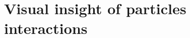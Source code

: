 \documentclass{sintefbeamer}
\newcommand{\pnavg}[1]{\left<#1\right>}
\newcommand{\nstavg}[1]{\overline{#1}_{nst}}
\newcommand{\nstrelavg}[1]{\overline{#1}_{nst}^{rel}}
\begin{document}


\section{Visual insight of particles interactions}
\end{document}
